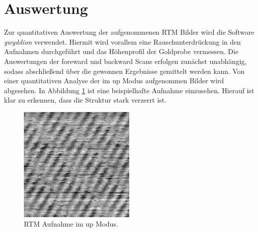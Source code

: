 \section{Auswertung}
Zur quantitativen Auswertung der aufgenommenen RTM Bilder wird die Software \emph{gwyddion}\cite{gwyddion}
verwendet. Hiermit wird vorallem eine Rauschunterdrückung in den Aufnahmen durchgeführt und das Höhenprofil
der Goldprobe vermessen. Die Auswertungen der foreward und backward Scans erfolgen zunächst unabhängig, sodass
abschließend über die gewonnen Ergebnisse gemittelt werden kann.
Von einer quantitativen Analyse der im up Modus aufgenommen Bilder wird abgesehen. In Abbildung \ref{fig: up} ist eine
beispielhafte Aufnahme einzusehen. Hierauf ist klar zu erkennen, dass die Struktur stark verzerrt ist.
\begin{figure}
  \centering
  \includegraphics[width = 0.5\textwidth]{../Messdaten/bilder/up.png}
  \caption{RTM Aufnahme im up Modus.}
  \label{fig: up}
\end{figure}

